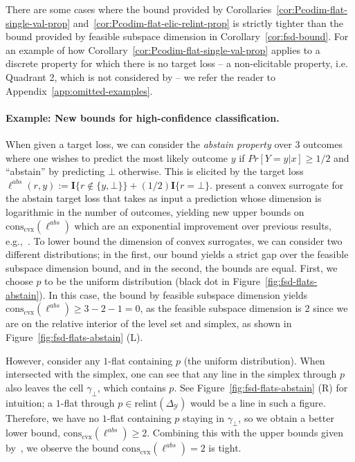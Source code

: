 \documentclass[anon,12pt]{colt2021} %
\newcommand{\Comments}{1}
\newcommand{\mytodo}[2]{\ifnum\Comments=1%
	\todo[linecolor=#1!80!black,backgroundcolor=#1,bordercolor=#1!80!black]{#2}\fi}
\newcommand{\raft}[1]{\mytodo{green!20!white}{RF: #1}}
\newcommand{\jessiet}[1]{\mytodo{purple!20!white}{JF: #1}}
\newcommand{\simplex}{\Delta_\Y}
\newcommand{\relint}[1]{\mathrm{relint}(#1)}
\newcommand{\conscvx}{\mathrm{cons}_\mathrm{cvx}}
\newcommand{\Y}{\mathcal{Y}}
\newcommand{\Ind}[1]{\mathbf{I}\{{#1}\}}
\begin{document}
There are some cases where the bound provided by Corollaries~\ref{cor:Pcodim-flat-single-val-prop} and~\ref{cor:Pcodim-flat-elic-relint-prop} is strictly tighter than the bound provided by feasible subspace dimension in Corollary~\ref{cor:fsd-bound}.
For an example of how Corollary~\ref{cor:Pcodim-flat-single-val-prop} applies to a discrete property for which there is no target loss -- a non-elicitable property, i.e. Quadrant 2, which is not considered by \citet{ramaswamy2018consistent} -- we refer the reader to Appendix~\ref{app:omitted-examples}.

\paragraph{Example: New bounds for high-confidence classification.}\label{subsec:examples-finite}
When given a target loss, we can consider the \emph{abstain property} over 3 outcomes where one wishes to predict the most likely outcome $y$ if $Pr[Y=y|x] \geq 1/2$ and ``abstain'' by predicting $\bot$ otherwise.
This is elicited by the target loss $\ell^{abs}(r,y) := \Ind{r \not \in \{y, \bot\}} + (1/2)\Ind{r = \bot}$. 
\citet{ramaswamy2016convex} present a convex surrogate for the abstain target loss that takes as input a prediction whose dimension is logarithmic in the number of outcomes, yielding new upper bounds on $\conscvx(\ell^{abs})$ which are an exponential improvement over previous results, e.g.,~\cite{crammer2001algorithmic}.
To lower bound the dimension of convex surrogates, we can consider two different distributions; in the first, our bound yields a strict gap over the feasible subspace dimension bound, and in the second, the bounds are equal.
First, we choose $p$ to be the uniform distribution (black dot in Figure~\ref{fig:fsd-flats-abstain}).
In this case, the bound by feasible subspace dimension yields $\conscvx(\ell^{abs}) \geq 3 - 2 - 1 = 0$, as the feasible subspace dimension is $2$ since we are on the relative interior of the level set and simplex, as shown in Figure~\ref{fig:fsd-flats-abstain} (L).




However, consider any $1$-flat containing $p$ (the uniform distribution).
When intersected with the simplex, one can see that any line in the simplex through $p$ also leaves the cell $\gamma_\bot$, which contains $p$.
See Figure~\ref{fig:fsd-flats-abstain} (R) for intuition; a $1$-flat through $p \in \relint{\simplex}$ would be a line in such a figure.
Therefore, we have no $1$-flat containing $p$ staying in $\gamma_\bot$, so we obtain a better lower bound, $\conscvx(\ell^{abs}) \geq 2$.
Combining this with the upper bounds given by~\cite{ramaswamy2018consistent}, we observe the bound $\conscvx(\ell^{abs}) = 2$ is tight.
\end{document}
